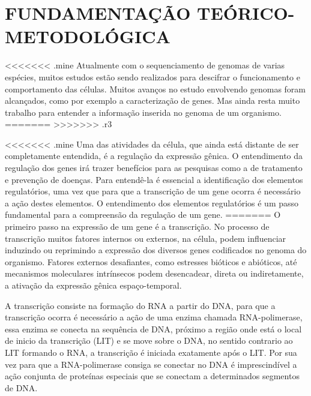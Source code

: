 \chapter{FUNDAMENTAÇÃO TEÓRICO-METODOLÓGICA}

<<<<<<< .mine
Atualmente com o sequenciamento de genomas de varias espécies, muitos estudos estão sendo realizados para descifrar o funcionamento e comportamento das células. Muitos avanços no estudo envolvendo genomas foram alcançados, como por exemplo a caracterização de genes. Mas ainda resta muito trabalho para entender a informação inserida no genoma de um organismo.
=======
>>>>>>> .r3

<<<<<<< .mine
Uma das atividades da célula, que ainda está distante de ser completamente entendida, é a regulação da expressão gênica. O entendimento da regulação dos genes irá trazer benefícios para as pesquisas como a de tratamento e prevenção de doenças. Para entendê-la é essencial a identificação dos elementos regulatórios, uma vez que para que a transcrição de um gene ocorra é necessário a ação destes elementos. O entendimento dos elementos regulatórios é um passo fundamental para a compreensão da regulação de um gene.
=======
O primeiro passo na expressão de um gene é a transcrição. No processo de transcrição muitos fatores internos ou externos, na célula, podem influenciar induzindo ou reprimindo a expressão dos diversos genes codificados no genoma do organismo. Fatores externos desafiantes, como estresses bióticos e abióticos, até mecanismos moleculares intrínsecos podem desencadear, direta ou indiretamente, a ativação da expressão gênica espaço-temporal.

A transcrição consiste na formação do RNA a partir do DNA, para que a transcrição ocorra é necessário a ação de uma enzima chamada RNA-polimerase, essa enzima se conecta na sequência de DNA, próximo a região onde está o local de inicio da transcrição (LIT) e se move sobre o DNA, no sentido contrario ao LIT formando o RNA, a transcrição é iniciada exatamente após o LIT. Por sua vez para que a RNA-polimerase consiga se conectar no DNA é imprescindível a ação conjunta de proteínas especiais que se conectam a determinados segmentos de DNA.


